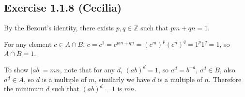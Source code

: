 \subsection*{Exercise 1.1.8 (Cecilia)}

By the Bezout's identity, there exists $ p, q \in \mathbb{Z} $ such that $ pm + qn = 1 $.

For any element $ c \in A \cap B $, $ c = c^1 = c^{pm + qn} = (c^m)^p (c^n)^q = 1^p 1^q = 1$, so $ A \cap B = 1 $.

To show $ |ab| = mn $, note that for any $ d $, $ (ab)^d = 1 $, so $ a^d = b^{-d} $, $ a^d \in B $, also $ a^d \in A $, so $ d $ is a multiple of $ m $, similarly we have $ d $ is a multiple of $ n $. Therefore the minimum $ d $ such that $ (ab)^d = 1 $ is $ mn $.